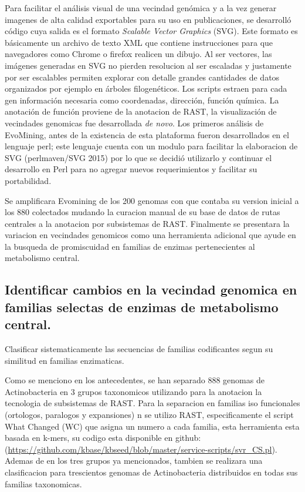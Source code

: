 \documentclass[12pt,twoside]{reedthesis}
\begin{document}
  Para facilitar el análisis visual de una vecindad genómica y a la vez
  generar imagenes de alta calidad exportables para su uso en
  publicaciones, se desarrolló código cuya salida es el formato
  \emph{Scalable Vector Graphics} (SVG). Este formato es básicamente un
  archivo de texto XML que contiene instrucciones para que navegadores
  como Chrome o firefox realicen un dibujo. Al ser vectores, las imágenes
  generadas en SVG no pierden resolucion al ser escaladas y justamente por
  ser escalables permiten explorar con detalle grandes cantidades de datos
  organizados por ejemplo en árboles filogenéticos. Los scripts estraen
  para cada gen información necesaria como coordenadas, dirección, función
  química. La anotación de función proviene de la anotacion de RAST, la
  visualización de vecindades genomicas fue desarrollada \emph{de novo}.
  Los primeros análisis de EvoMining, antes de la existencia de esta
  plataforma fueron desarrollados en el lenguaje perl; este lenguaje
  cuenta con un modulo para facilitar la elaboracion de SVG (perlmaven/SVG
  2015) por lo que se decidió utilizarlo y continuar el desarrollo en Perl
  para no agregar nuevos requerimientos y facilitar su portabilidad.
  
  Se amplificara Evomining de los 200 genomas con que contaba su version
  inicial a los 880 colectados mudando la curacion manual de su base de
  datos de rutas centrales a la anotacion por subsistemas de RAST.
  Finalmente se presentara la variacion en vecindades genomicos como una
  herramienta adicional que ayude en la busqueda de promiscuidad en
  familias de enzimas pertenecientes al metabolismo central.
  
  \subsection{Identificar cambios en la vecindad genomica en familias
  selectas de enzimas de metabolismo
  central.}\label{identificar-cambios-en-la-vecindad-genomica-en-familias-selectas-de-enzimas-de-metabolismo-central.-1}
  
  Clasificar sistematicamente las secuencias de familias codificantes
  segun su similitud en familias enzimaticas.
  
  Como se menciono en los antecedentes, se han separado 888 genomas de
  Actinobacteria en 3 grupos taxonomicos utilizando para la anotacion la
  tecnologia de subsistemas de RAST. Para la separacion en familias iso
  funcionales (ortologos, paralogos y expansiones) n se utilizo RAST,
  especificamente el script What Changed (WC) que asigna un numero a cada
  familia, esta herramienta esta basada en k-mers, su codigo esta
  disponible en github:
  (\url{https://github.com/kbase/kbseed/blob/master/service-scripts/svr_CS.pl}).
  Ademas de en los tres grupos ya mencionados, tambien se realizara una
  clasificacion para trescientos genomas de Actinobacteria distribuidos en
  todas sus familias taxonomicas.
  
\end{document}
